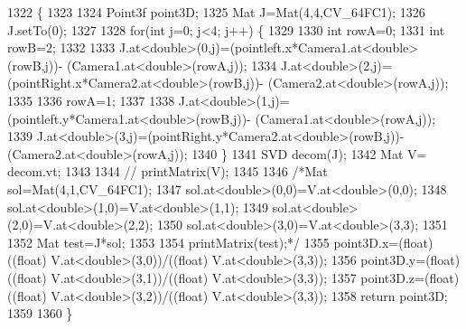 \begin{DoxyCode}
1322                                                                                                      \{
1323 
1324     Point3f point3D;
1325     Mat J=Mat(4,4,CV\_64FC1);
1326     J.setTo(0);
1327 
1328     \textcolor{keywordflow}{for}(\textcolor{keywordtype}{int} j=0; j<4; j++) \{
1329 
1330         \textcolor{keywordtype}{int} rowA=0;
1331         \textcolor{keywordtype}{int} rowB=2;
1332 
1333         J.at<\textcolor{keywordtype}{double}>(0,j)=(pointleft.x*Camera1.at<\textcolor{keywordtype}{double}>(rowB,j))- (Camera1.at<\textcolor{keywordtype}{double}>(rowA,j));
1334         J.at<\textcolor{keywordtype}{double}>(2,j)=(pointRight.x*Camera2.at<\textcolor{keywordtype}{double}>(rowB,j))- (Camera2.at<\textcolor{keywordtype}{double}>(rowA,j));
1335 
1336         rowA=1;
1337 
1338         J.at<\textcolor{keywordtype}{double}>(1,j)=(pointleft.y*Camera1.at<\textcolor{keywordtype}{double}>(rowB,j))- (Camera1.at<\textcolor{keywordtype}{double}>(rowA,j));
1339         J.at<\textcolor{keywordtype}{double}>(3,j)=(pointRight.y*Camera2.at<\textcolor{keywordtype}{double}>(rowB,j))- (Camera2.at<\textcolor{keywordtype}{double}>(rowA,j));
1340     \}
1341     SVD decom(J);
1342     Mat V= decom.vt;
1343 
1344     \textcolor{comment}{// printMatrix(V);}
1345 
1346     \textcolor{comment}{/*Mat sol=Mat(4,1,CV\_64FC1);}
1347 \textcolor{comment}{        sol.at<double>(0,0)=V.at<double>(0,0);}
1348 \textcolor{comment}{        sol.at<double>(1,0)=V.at<double>(1,1);}
1349 \textcolor{comment}{        sol.at<double>(2,0)=V.at<double>(2,2);}
1350 \textcolor{comment}{        sol.at<double>(3,0)=V.at<double>(3,3);}
1351 \textcolor{comment}{}
1352 \textcolor{comment}{        Mat test=J*sol;}
1353 \textcolor{comment}{}
1354 \textcolor{comment}{        printMatrix(test);*/}
1355     point3D.x=(float) ((\textcolor{keywordtype}{float}) V.at<\textcolor{keywordtype}{double}>(3,0))/((float) V.at<\textcolor{keywordtype}{double}>(3,3));
1356     point3D.y=(float) ((\textcolor{keywordtype}{float}) V.at<\textcolor{keywordtype}{double}>(3,1))/((float) V.at<\textcolor{keywordtype}{double}>(3,3));
1357     point3D.z=(float) ((\textcolor{keywordtype}{float}) V.at<\textcolor{keywordtype}{double}>(3,2))/((float) V.at<\textcolor{keywordtype}{double}>(3,3));
1358     \textcolor{keywordflow}{return} point3D;
1359 
1360 \}
\end{DoxyCode}
\mbox{\label{classStereoCamera_aaef25d8723eefdbab6e27c348492126b}} 
